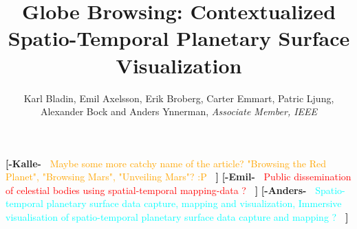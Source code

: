 \documentclass[journal]{vgtc}                %
\title{Globe Browsing: Contextualized Spatio-Temporal Planetary Surface Visualization}
\author{Karl Bladin, Emil Axelsson, Erik Broberg, Carter Emmart, Patric Ljung, \\ Alexander Bock and Anders Ynnerman, \textit{Associate Member, IEEE}}
\newcommand{\kallecomment}[1]{\textbf{[-Kalle-~}
    \textcolor{orange}{#1}
    \textbf{~]}}
\newcommand{\emilcomment}[1]{\textbf{[-Emil-~}
    \textcolor{red}{#1}
    \textbf{~]}}
\newcommand{\anderscomment}[1]{\textbf{[-Anders-~}
    \textcolor{cyan}{#1}
    \textbf{~]}}
\begin{document}

 \label{sec:introduction}
\maketitle
\kallecomment{Maybe some more catchy name of the article? "Browsing the Red Planet", "Browsing Mars", "Unveiling Mars"? :P}
\emilcomment{Public dissemination of celestial bodies using spatial-temporal mapping-data ?}
\anderscomment{Spatio-temporal planetary surface data capture, mapping and visualization, 
Immersive visualisation of spatio-temporal planetary surface data capture and mapping ?}
\end{document}
